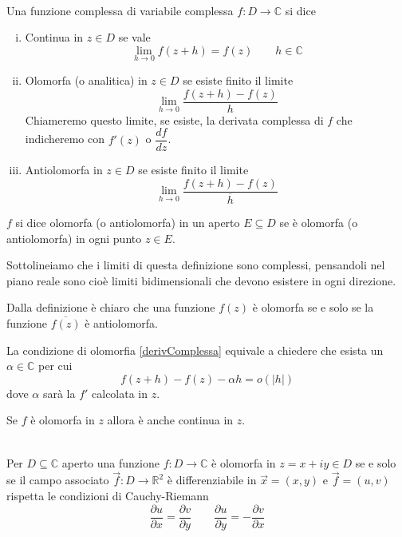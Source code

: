 \documentclass[11pt,a4paper,twoside]{book}
\newenvironment{teorema}[1][\empty]{\begin{Teorema}{
\ifx\empty#1\relax\else\mdseries\itshape#1\\\fi
}{}}{\end{Teorema}}
\newenvironment{definizione}[1][\empty]{\begin{Definizione}{
\ifx\empty#1\relax\else\mdseries\itshape#1\\\fi
}{}}{\end{Definizione}}
\newenvironment{importante}[0]{ 
  \begin{center}\begin{tcolorbox}[enhanced,
  before skip=2mm,after skip=3mm,
  boxrule=0.4pt,left=5mm,right=2mm,top=1mm,bottom=1mm,
  colback=yellow!50,
  colframe=yellow!20!black,
  sharp corners,arc=3mm,
  underlay={
  	\path[fill=red!50!black,draw=none] (interior.south west) rectangle 			node[white]{\Huge\bfseries !} ([xshift=4mm]interior.north west);
  },
  drop fuzzy shadow]
  }{
 \normalsize \end{tcolorbox}\end{center}
}
\theoremstyle{esss}
\theoremstyle{dotless}
\numberwithin{equation}{section} %
\begin{document}
\begin{definizione}
Una funzione complessa di variabile complessa $f:D\rightarrow\mathbb{C}$ si dice
\begin{enumerate}[i.]
\item Continua in $z\in D$ se vale
\begin{equation}\label{derivComplessa}
\lim_{h\rightarrow 0} f(z+h)=f(z) \qquad h\in\mathbb{C}
\end{equation}
\item Olomorfa (o analitica) in $z\in D$ se esiste finito il limite 
\begin{equation}\label{derivComplessa}
\lim_{h\rightarrow 0} \dfrac{f(z+h)-f(z)}{h}
\end{equation}
Chiameremo questo limite, se esiste, la derivata complessa di $f$ che indicheremo con $f'(z)$ o $\dfrac{df}{dz}$.\\
\item Antiolomorfa in $z\in D$ se esiste finito il limite
\[
\lim_{h\rightarrow 0} \dfrac{f(z+h)-f(z)}{\overline{h}}
\]
\end{enumerate}
$f$ si dice olomorfa (o antiolomorfa) in un aperto $E\subseteq D$ se è olomorfa (o antiolomorfa) in ogni punto $z\in E$.
\end{definizione}

Sottolineiamo che i limiti di questa definizione sono complessi, pensandoli nel piano reale sono cioè limiti bidimensionali che devono esistere in ogni direzione.

Dalla definizione è chiaro che una funzione $f(z)$ è olomorfa se e solo se la funzione $\overline{f(z)}$ è antiolomorfa.

La condizione di olomorfia \eqref{derivComplessa} equivale a chiedere che esista un $\alpha\in\mathbb{C}$ per cui
\[
f(z+h)-f(z)-\alpha h = o(|h|)
\]
dove $\alpha$ sarà la $f'$ calcolata in $z$.


\begin{importante}
Se $f$ è olomorfa in $z$ allora è anche continua in $z$.
\end{importante}

\begin{teorema}
Per $D\subseteq\mathbb{C}$ aperto una funzione $f:D\rightarrow\mathbb{C}$ è olomorfa in $z=x+iy\in D$ se e solo se il campo associato $\vec{f}:D\rightarrow\mathbb{R}^2$ è differenziabile in $\vec{x}=(x,y)$ e $\vec{f}=(u,v)$ rispetta le condizioni di Cauchy-Riemann
\[
\dfrac{\partial u}{\partial x}=\dfrac{\partial v}{\partial y} \qquad
\dfrac{\partial u}{\partial y}=-\dfrac{\partial v}{\partial x}
\]
\end{teorema}
\end{document}
